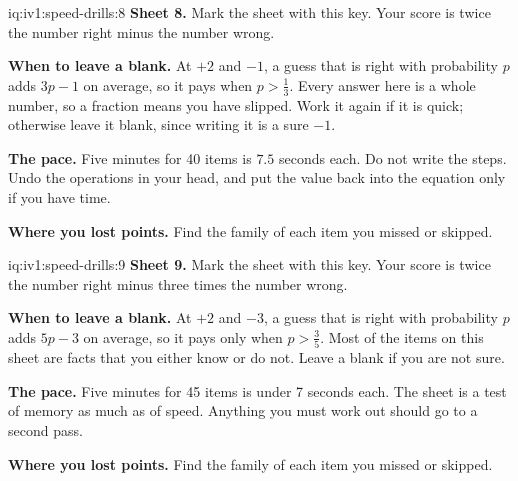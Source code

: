 \enlargethispage{-1\baselineskip}%
\begin{solution}{iq:iv1:speed-drills:8}
\textbf{Sheet 8.} Mark the sheet with this key. Your score is twice the number right minus the number wrong.
\par\nopagebreak


\textbf{When to leave a blank.} At $+2$ and $-1$, a guess that is right with probability $p$ adds $3p - 1$ on average, so it pays when $p > \tfrac13$. Every answer here is a whole number, so a fraction means you have slipped. Work it again if it is quick; otherwise leave it blank, since writing it is a sure $-1$.

\textbf{The pace.} Five minutes for 40 items is $7.5$ seconds each. Do not write the steps. Undo the operations in your head, and put the value back into the equation only if you have time.

\textbf{Where you lost points.} Find the family of each item you missed or skipped.


\end{solution}

\begin{solution}{iq:iv1:speed-drills:9}
\textbf{Sheet 9.} Mark the sheet with this key. Your score is twice the number right minus three times the number wrong.
\par\nopagebreak


\textbf{When to leave a blank.} At $+2$ and $-3$, a guess that is right with probability $p$ adds $5p - 3$ on average, so it pays only when $p > \tfrac35$. Most of the items on this sheet are facts that you either know or do not. Leave a blank if you are not sure.

\textbf{The pace.} Five minutes for 45 items is under 7 seconds each. The sheet is a test of memory as much as of speed. Anything you must work out should go to a second pass.

\textbf{Where you lost points.} Find the family of each item you missed or skipped.


\end{solution}

